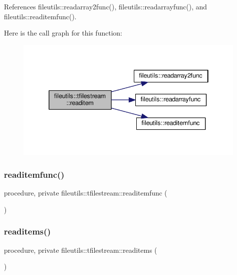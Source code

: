 References fileutils\+::readarray2func(), fileutils\+::readarrayfunc(), and fileutils\+::readitemfunc().

Here is the call graph for this function\+:
\nopagebreak
\begin{figure}[H]
\begin{center}
\leavevmode
\includegraphics[width=334pt]{structfileutils_1_1tfilestream_ab89590f13c1bb79768c5987387cd0f15_cgraph}
\end{center}
\end{figure}
\mbox{\label{structfileutils_1_1tfilestream_ad125856e9fe396573b34f410698ad5d9}} 
\subsubsection{\texorpdfstring{readitemfunc()}{readitemfunc()}}
{\footnotesize\ttfamily procedure, private fileutils\+::tfilestream\+::readitemfunc (\begin{DoxyParamCaption}{ }\end{DoxyParamCaption})\hspace{0.3cm}{\ttfamily [private]}}

\mbox{\label{structfileutils_1_1tfilestream_ae50e3d80385fe3fc94e0bee3ca233e24}} 
\subsubsection{\texorpdfstring{readitems()}{readitems()}}
{\footnotesize\ttfamily procedure, private fileutils\+::tfilestream\+::readitems (\begin{DoxyParamCaption}{ }\end{DoxyParamCaption})\hspace{0.3cm}{\ttfamily [private]}}

